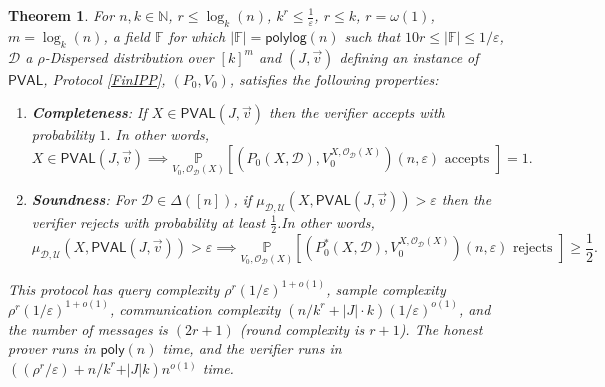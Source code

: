 \documentclass[10pt,a4paper]{article}
\newtheorem{theorem}{Theorem}[section]
\newcommand{\poly}{\mathsf{poly}}
\newcommand{\polylog}{\mathsf{polylog}}
\newcommand{\PVAL}{\mathsf{PVAL}}
\newcommand{\F}{\mathbb{F}}
\newcommand{\N}{\mathbb{N}}
\newcommand{\sD}{\mathcal{D}}
\begin{document}
\begin{theorem}
\label{ippthm}
For $n,k\in \N$, $ r\leq \log_{k}(n)$, $k^{r}\leq \frac{1}{\varepsilon}$, $r\leq k$, $r=\omega(1)$, $m=\log_{k}(n)$, a field $\F$ for which $\vert \F \vert=\polylog(n)$ such that $10r\leq |\F|\leq 1/\varepsilon$, $\sD$ a $\rho$-Dispersed distribution over $[k]^{m}$ and $(J,\vec{v})$ defining an instance of $\PVAL$, Protocol \ref{FinIPP}, $(P_0, V_0)$, satisfies the following properties:

\begin{enumerate}
    \item \textbf{Completeness}: If $X\in \PVAL(J,\Vec{v})$ then the verifier accepts with probability $1$. In other words,
    \begin{equation*}
        X\in \PVAL(J,\Vec{v})\implies \underset{V_{0},\mathcal{O}_{\mathcal{D}}(X)}{\mathbb{P}}\left[(P_{0}(X,\sD),V_{0}^{X,\mathcal{O}_{\sD}(X)})(n,\varepsilon) \text{ accepts }\right]=1.
    \end{equation*}
    \item \textbf{Soundness}: For $\sD\in \Delta([n])$, if $\mu_{\sD,\mathcal{U}}(X,\PVAL(J,\vec{v}))>\varepsilon$ then the verifier rejects with probability at least $\frac{1}{2}$.In other words,
    \begin{equation*}
        \mu_{\sD,\mathcal{U}}(X,\PVAL(J,\vec{v}))>\varepsilon\implies \underset{V_{0},\mathcal{O}_{\mathcal{D}}(X)}{\mathbb{P}}\left[(P^{\ast}_{0}(X,\sD),V_{0}^{X,\mathcal{O}_{\sD}(X)})(n,\varepsilon) \text{ rejects } \right]\geq \frac{1}{2}.
    \end{equation*}
\end{enumerate}

This protocol has query complexity $\rho^{r}(1/\varepsilon)^{1+o(1)}$, sample complexity $\rho^{r}(1/\varepsilon)^{1+o(1)}$, communication complexity $(n/k^{r}+|J|\cdot k)(1/\varepsilon)^{o(1)}$, and the number of messages is $(2r + 1)$ (round complexity is $r+1$). The honest prover runs in $\poly(n)$ time, and the verifier runs in $((\rho^{r}/\varepsilon) + n/k^{r} + \vert J\vert k)n^{o(1)}$ time.
\end{theorem}
\end{document}
